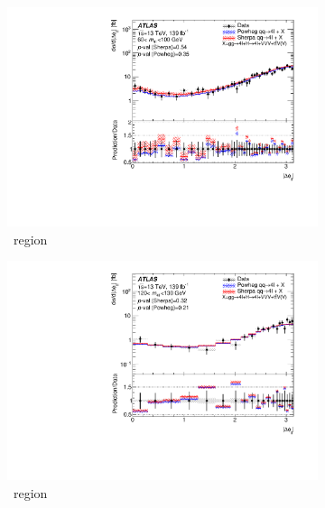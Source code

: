 \begin{figure}[H]
    \begin{subfigure}{.49\textwidth}\centering
      \includegraphics[width=.95\linewidth]{Figures/m4l/UnfoldedResults/Unfolded_Data_deltaPhiLeadingLeptons_m4l60-100.pdf}\caption{\ZFourL \ region}\label{fig:sub-first}
    \end{subfigure}
    \begin{subfigure}{.49\textwidth}\centering
      \includegraphics[width=.95\linewidth]{Figures/m4l/UnfoldedResults/Unfolded_Data_deltaPhiLeadingLeptons_m4l120-130.pdf} \caption{\HFourL \ region}\label{fig:sub-second}
    \end{subfigure}
    \begin{subfigure}{.49\textwidth}\centering

\end{subfigure}
\end{figure}
